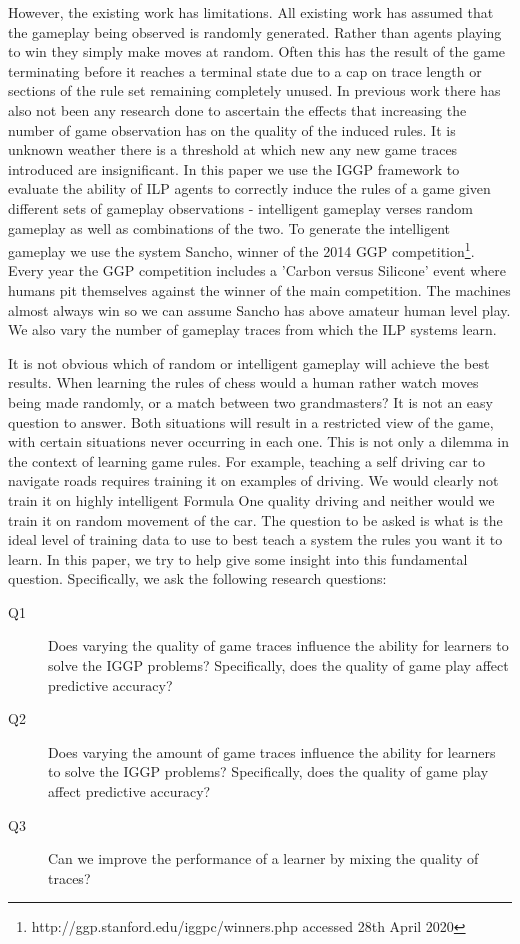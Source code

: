 However, the existing work has limitations. All existing work has assumed that the gameplay being observed is randomly generated. Rather than agents playing to win they simply make moves at random. Often this has the result of the game terminating before it reaches a terminal state due to a cap on trace length or sections of the rule set remaining completely unused. In previous work there has also not been any research done to ascertain the effects that increasing the number of game observation has on the quality of the induced rules. It is unknown weather there is a threshold at which new any new game traces introduced are insignificant. In this paper we use the IGGP framework to evaluate the ability of ILP agents to correctly induce the rules of a game given different sets of gameplay observations - intelligent gameplay verses random gameplay as well as combinations of the two. To generate the intelligent gameplay we use the system Sancho, winner of the 2014 GGP competition\footnote{http://ggp.stanford.edu/iggpc/winners.php accessed 28th April 2020}. Every year the GGP competition includes a 'Carbon versus Silicone' event where humans pit themselves against the winner of the main competition. The machines almost always win\cite{Genesereth/GGPOverview} so we can assume Sancho has above amateur human level play. We also vary the number of gameplay traces from which the ILP systems learn.


It is not obvious which of random or intelligent gameplay will achieve the best results. When learning the rules of chess would a human rather watch moves being made randomly, or a match between two grandmasters? It is not an easy question to answer. Both situations will result in a restricted view of the game, with certain situations never occurring in each one. This is not only a dilemma in the context of learning game rules. For example, teaching a self driving car to navigate roads requires training it on examples of driving. We would clearly not train it on highly intelligent Formula One quality driving and neither would we train it on random movement of the car. The question to be asked is what is the ideal level of training data to use to best teach a system the rules you want it to learn. In this paper, we try to help give some insight into this fundamental question. Specifically, we ask the following research questions:

\begin{description}
\item[Q1] Does varying the quality of game traces influence the ability for learners to solve the IGGP problems? Specifically, does the quality of game play affect predictive accuracy?
\item[Q2] Does varying the amount of game traces influence the ability for learners to solve the IGGP problems? Specifically, does the quality of game play affect predictive accuracy?
\item[Q3] Can we improve the performance of a learner by mixing the quality of traces?
\end{description}


